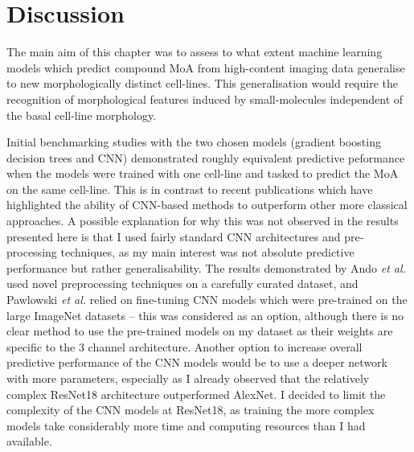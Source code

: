 \documentclass[a4paper,11pt,twoside,openright]{scrbook}
\begin{document}

\section{Discussion}

The main aim of this chapter was to assess to what extent machine learning models which predict compound MoA from high-content imaging data generalise to new morphologically distinct cell-lines.
This generalisation would require the recognition of morphological features induced by small-molecules independent of the basal cell-line morphology.

Initial benchmarking studies with the two chosen models (gradient boosting decision trees and CNN) demonstrated roughly equivalent predictive peformance when the models were trained with one cell-line and tasked to predict the MoA on the same cell-line.
This is in contrast to recent publications which have highlighted the ability of CNN-based methods to outperform other more classical approaches. \cite{Ando2017, Pawlowski2016}
A possible explanation for why this was not observed in the results presented here is that I used fairly standard CNN architectures and pre-processing techniques, as my main interest was not absolute predictive performance but rather generalisability.
The results demonstrated by Ando \textit{et al.} used novel preprocessing techniques on a carefully curated dataset, and Pawlowski \textit{et al.} relied on fine-tuning CNN models which were pre-trained on the large ImageNet datasets -- this was considered as an option, although there is no clear method to use the pre-trained models on my dataset as their weights are specific to the 3 channel architecture.
Another option to increase overall predictive performance of the CNN models would be to use a deeper network with more parameters, especially as I already observed that the relatively complex ResNet18 architecture outperformed AlexNet.
I decided to limit the complexity of the CNN models at ResNet18, as training the more complex models take considerably more time and computing resources than I had available.
\end{document}
